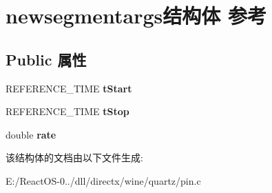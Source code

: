 \hypertarget{structnewsegmentargs}{}\section{newsegmentargs结构体 参考}
\label{structnewsegmentargs}
\subsection*{Public 属性}
\begin{DoxyCompactItemize}
\item 
\mbox{\label{structnewsegmentargs_a099c4fb316bb90b5a4ea0ee5ab01a9e4}} 
R\+E\+F\+E\+R\+E\+N\+C\+E\+\_\+\+T\+I\+ME {\bfseries t\+Start}
\item 
\mbox{\label{structnewsegmentargs_a4eb9bd7993b2243e832fd137d8e66188}} 
R\+E\+F\+E\+R\+E\+N\+C\+E\+\_\+\+T\+I\+ME {\bfseries t\+Stop}
\item 
\mbox{\label{structnewsegmentargs_a66113be4e46d5d337886fb6fa8bb55f9}} 
double {\bfseries rate}
\end{DoxyCompactItemize}


该结构体的文档由以下文件生成\+:\begin{DoxyCompactItemize}
\item 
E\+:/\+React\+O\+S-\/0../dll/directx/wine/quartz/pin.\+c\end{DoxyCompactItemize}
